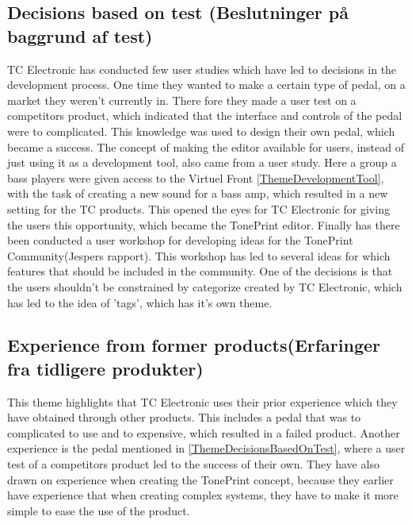 \subsection*{Decisions based on test (Beslutninger på baggrund af test)}
\label{ThemeDecisionsBasedOnTest}
 TC Electronic has conducted few user studies which have led to decisions in the development process. One time they wanted to make a certain type of pedal, on a market they weren't currently in. There fore they made a user test on a competitors product, which indicated that the interface and controls of the pedal were to complicated. This knowledge was used to design their own pedal, which became a success. The concept of making the editor available for users, instead of just using it as a development tool, also came from a user study. Here a group a bass players were given access to the Virtuel Front \autoref{ThemeDevelopmentTool}, with the task of creating a new sound for a bass amp, which resulted in a new setting for the TC products. This opened the eyes for TC Electronic for giving the users this opportunity, which became the TonePrint editor. Finally has there been conducted a user workshop for developing ideas for the TonePrint Community(Jespers rapport). This workshop has led to several ideas for which features that should be included in the community. One of the decisions is that the users shouldn't be constrained by categorize created by TC Electronic, which has led to the idea of 'tags', which has it's own theme.
 
 \subsection*{Experience from former products(Erfaringer fra tidligere produkter)}
 \label{ThemeExperienceFromFormerProducts}
 This theme highlights that TC Electronic uses their prior experience which they have obtained through other products. This includes a pedal that was to complicated to use and to expensive, which resulted in a failed product. Another experience is the pedal mentioned in \autoref{ThemeDecisionsBasedOnTest}, where a user test of a competitors product led to the success of their own. They have also drawn on experience when creating the TonePrint concept, because they earlier have experience that when creating complex systems, they have to make it more simple to ease the use of the product.
 
